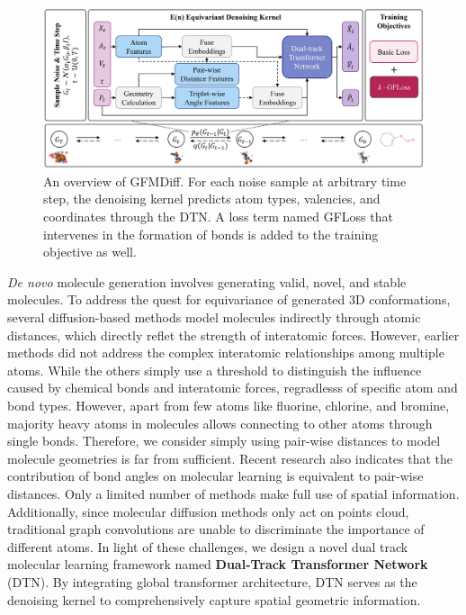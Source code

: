 \documentclass[letterpaper]{article}
\begin{document}
\begin{figure}[t]
\centering
\includegraphics[width=0.8\linewidth]{overview_gfmdiff.png}
\caption{An overview of GFMDiff. For each noise sample at arbitrary time step, the denoising kernel predicts atom types, valencies, and coordinates through the DTN. A loss term named GFLoss that intervenes in the formation of bonds is added to the training objective as well.}
\label{fig:gfmdiff}
\end{figure}

{\itshape De novo} molecule generation involves generating valid, novel, and stable molecules. To address the quest for equivariance of generated 3D conformations, several diffusion-based methods \cite{edm_22_hoogeboom,mdm_23_huang} model molecules indirectly through atomic distances, which directly reflet the strength of interatomic forces. However, earlier methods \cite{edm_22_hoogeboom} did not address the complex interatomic relationships among multiple atoms. While the others \cite{mdm_23_huang} simply use a threshold to distinguish the influence caused by chemical bonds and interatomic forces, regradlesss of specific atom and bond types. However, apart from few atoms like fluorine, chlorine, and bromine, majority heavy atoms in molecules allows connecting to other atoms through single bonds. Therefore, we consider simply using pair-wise distances to model molecule geometries is far from sufficient. Recent research \cite{moleformer_23_yuan} also indicates that the contribution of bond angles on molecular learning is equivalent to pair-wise distances. Only a limited number of methods make full use of spatial information. Additionally, since molecular diffusion methods only act on points cloud, traditional graph convolutions are unable to discriminate the importance of different atoms. In light of these challenges, we design a novel dual track molecular learning framework named \textbf{Dual-Track Transformer Network} (DTN). By integrating global transformer architecture, DTN serves as the denoising kernel to comprehensively capture spatial geometric information.
\end{document}
